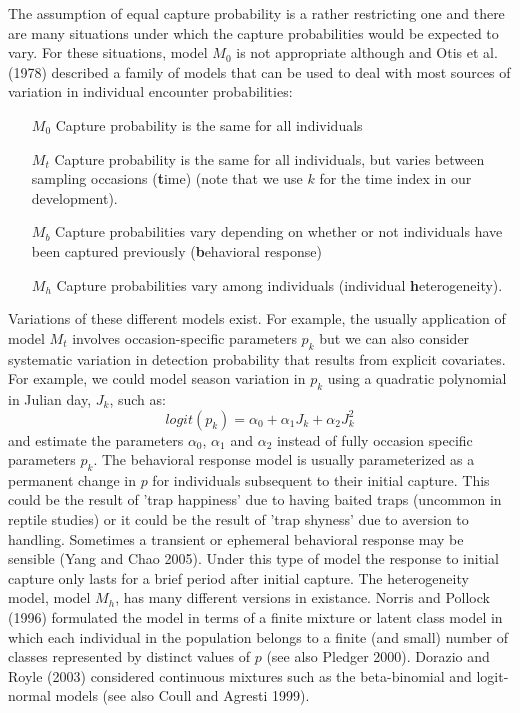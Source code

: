 \documentclass{book}
\begin{document}
The assumption of equal capture probability is a rather restricting
one and there are many situations under which the capture
probabilities would be expected to vary. For these situations, model
$M_0$ is not appropriate although and Otis et al. (1978) described a
family of models that can be used to deal with most sources of
variation in individual encounter probabilities:
\begin{itemize}
\item[$M_0$] Capture probability is the same for all individuals
\item[$M_t$] Capture probability is the same for all individuals, but
  varies between sampling occasions (\textbf{t}ime) (note that we use
  $k$ for the time index in our development).
\item[$M_b$] Capture probabilities vary depending on whether or not individuals have been captured previously (\textbf{b}ehavioral response)
\item[$M_h$] Capture probabilities vary among individuals (individual \textbf{h}eterogeneity).
\end{itemize}

Variations of these different models exist. For example, the usually
application of model $M_t$ involves occasion-specific parameters
$p_{k}$ but we can also consider systematic variation in detection
probability that results from explicit covariates. For example, we
could model season variation in $p_k$ using a quadratic polynomial
in Julian day, $J_{k}$, such as:
\[
 logit(p_{k}) = \alpha_0 + \alpha_1 J_{k} + \alpha_2 J^{2}_{k}
\]
and estimate the parameters $\alpha_0$, $\alpha_1$ and $\alpha_2$
instead of fully occasion specific parameters $p_k$.  The behavioral
response model is usually parameterized as a permanent change in $p$
for individuals subsequent to their initial capture. This could be the
result of 'trap happiness' due to having baited traps (uncommon in
reptile studies) or it could be the result of 'trap shyness' due to
aversion to handling. Sometimes a transient or ephemeral behavioral
response may be sensible (Yang and Chao 2005). Under this type of
model the response to initial capture only lasts for a brief period
after initial capture. The heterogeneity model, model $M_h$, has many
different versions in existance. Norris and Pollock (1996) formulated
the model in terms of a finite mixture or latent class model in which
each individual in the population belongs to a finite (and small)
number of classes represented by distinct values of $p$ (see also
Pledger 2000). Dorazio and Royle (2003) considered continuous mixtures
such as the beta-binomial and logit-normal models (see also Coull and
Agresti 1999).
\end{document}
